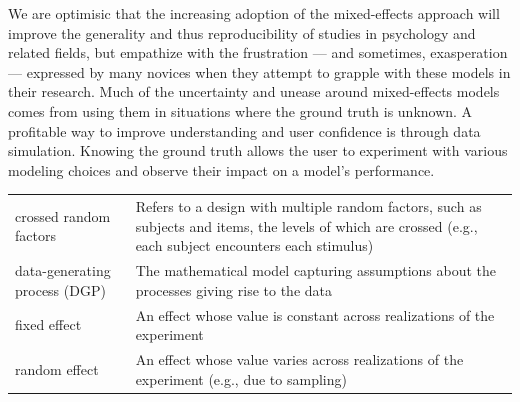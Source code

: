 \documentclass[doc,floatsintext]{apa6}
\begin{document}
We are optimisic that the increasing adoption of the mixed-effects
approach will improve the generality and thus reproducibility of studies
in psychology and related fields, but empathize with the frustration ---
and sometimes, exasperation --- expressed by many novices when they
attempt to grapple with these models in their research. Much of the
uncertainty and unease around mixed-effects models comes from using them
in situations where the ground truth is unknown. A profitable way to
improve understanding and user confidence is through data simulation.
Knowing the ground truth allows the user to experiment with various
modeling choices and observe their impact on a model's performance.

\begin{tcolorbox}[colback=black!5!white,colframe=white!5!black,title=Box 1. Glossary of terms]
\begin{longtable}[]{@{}ll@{}}
\begin{minipage}[t]{0.29\columnwidth}\raggedright
crossed random factors\strut
\end{minipage} & \begin{minipage}[t]{0.65\columnwidth}\raggedright
Refers to a design with multiple random factors, such as subjects and items, the levels of which are crossed (e.g., each subject encounters each stimulus) \strut
\end{minipage}\tabularnewline
\begin{minipage}[t]{0.29\columnwidth}\raggedright
data-generating process (DGP)\strut
\end{minipage} & \begin{minipage}[t]{0.65\columnwidth}\raggedright
The mathematical model capturing assumptions about the processes giving rise to the data\strut
\end{minipage}\tabularnewline
\begin{minipage}[t]{0.29\columnwidth}\raggedright
fixed effect\strut
\end{minipage} & \begin{minipage}[t]{0.65\columnwidth}\raggedright
An effect whose value is constant across realizations of the experiment\strut
\end{minipage}\tabularnewline
\begin{minipage}[t]{0.29\columnwidth}\raggedright
random effect\strut
\end{minipage} & \begin{minipage}[t]{0.65\columnwidth}\raggedright
An effect whose value varies across realizations of the experiment (e.g., due to sampling)\strut

\end{minipage}
\end{longtable}
\end{tcolorbox}
\end{document}
